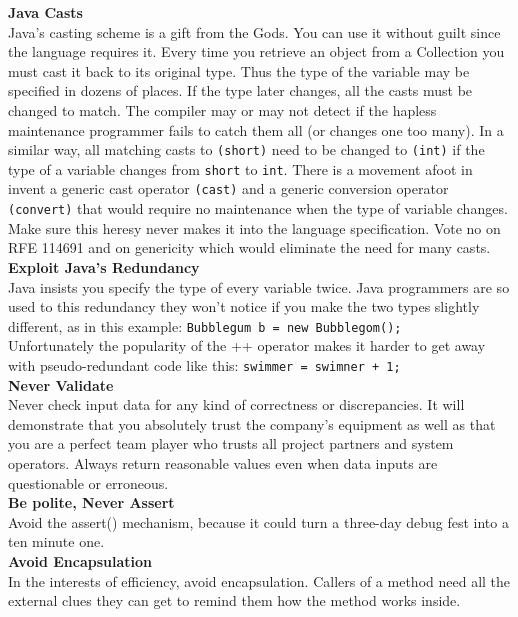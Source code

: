 \documentclass[11pt,twoside,a4paper]{article}
\begin{document}
\textbf{Java Casts}~\\
Java's casting scheme is a gift from the Gods. You can use it without guilt since the language requires it. Every time you retrieve an object from a Collection you must cast it back to its original type. Thus the type of the variable may be specified in dozens of places. If the type later changes, all the casts must be changed to match. The compiler may or may not detect if the hapless maintenance programmer fails to catch them all (or changes one too many). In a similar way, all matching casts to \texttt{(short)} need to be changed to \texttt{(int)} if the type of a variable changes from \texttt{short} to \texttt{int}. There is a movement afoot in invent a generic cast operator \texttt{(cast)} and a generic conversion operator \texttt{(convert)} that would require no maintenance when the type of variable changes. Make sure this heresy never makes it into the language specification. Vote no on RFE 114691 and on genericity which would eliminate the need for many casts. ~\\

\textbf{Exploit Java's Redundancy}~\\
Java insists you specify the type of every variable twice. Java programmers are so used to this redundancy they won't notice if you make the two types slightly different, as in this example: \texttt{Bubblegum b = new Bubblegom();}~\\

Unfortunately the popularity of the ++ operator makes it harder to get away with pseudo-redundant code like this: \texttt{swimmer = swimner + 1;}~\\ 

\textbf{Never Validate}~\\
Never check input data for any kind of correctness or discrepancies. It will demonstrate that you absolutely trust the company's equipment as well as that you are a perfect team player who trusts all project partners and system operators. Always return reasonable values even when data inputs are questionable or erroneous.~\\ 

\textbf{Be polite, Never Assert}~\\
Avoid the assert() mechanism, because it could turn a three-day debug fest into a ten minute one.~\\ 

\textbf{Avoid Encapsulation}~\\
In the interests of efficiency, avoid encapsulation. Callers of a method need all the external clues they can get to remind them how the method works inside.~\\ 
\end{document}
